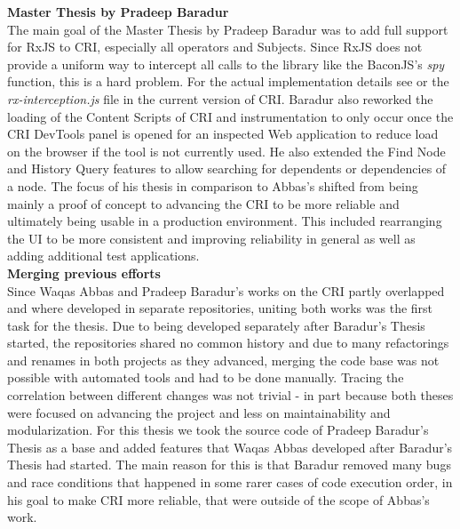 	\textbf{Master Thesis by Pradeep Baradur}\\
	 \cite{ThesisBaradur} The main goal of the Master Thesis by Pradeep Baradur was to add full support for RxJS to CRI, especially all operators and Subjects. Since RxJS does not provide a uniform way to intercept all calls to the library like the BaconJS's \emph{spy} function, this is a hard problem. For the actual implementation details see \cite{ThesisBaradur} or the \emph{rx-interception.js} file in the current version of CRI. Baradur also reworked the loading of the Content Scripts of CRI and instrumentation to only occur once the CRI DevTools panel is opened for an inspected Web application to reduce load on the browser if the tool is not currently used. He also extended the Find Node and History Query features to allow searching for dependents or dependencies of a node. The focus of his thesis in comparison to Abbas's shifted from being mainly a proof of concept to advancing the CRI to be more reliable and ultimately being usable in a production environment. This included rearranging the UI to be more consistent and improving reliability in general as well as adding additional test applications.\\		
		
	\textbf{Merging previous efforts}\\
	Since Waqas Abbas and Pradeep Baradur's works on the CRI partly overlapped and where developed in separate repositories, uniting both works was the first task for the thesis. Due to being developed separately after Baradur's Thesis started, the repositories shared no common history and due to many refactorings and renames in both projects as they advanced, merging the code base was not possible with automated tools and had to be done manually. Tracing the correlation between different changes was not trivial - in part because both theses were focused on advancing the project and less on maintainability and modularization. For this thesis we took the source code of Pradeep Baradur's Thesis as a base and added features that Waqas Abbas developed after Baradur's Thesis had started. The main reason for this is that Baradur removed many bugs and race conditions that happened in some rarer cases of code execution order, in his goal to make CRI more reliable, that were outside of the scope of Abbas's work.
		

